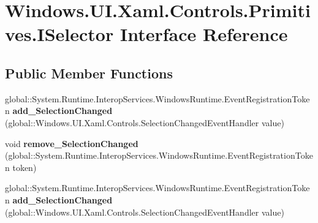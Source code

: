 \hypertarget{interface_windows_1_1_u_i_1_1_xaml_1_1_controls_1_1_primitives_1_1_i_selector}{}\section{Windows.\+U\+I.\+Xaml.\+Controls.\+Primitives.\+I\+Selector Interface Reference}
\label{interface_windows_1_1_u_i_1_1_xaml_1_1_controls_1_1_primitives_1_1_i_selector}
\subsection*{Public Member Functions}
\begin{DoxyCompactItemize}
\item 
\mbox{\label{interface_windows_1_1_u_i_1_1_xaml_1_1_controls_1_1_primitives_1_1_i_selector_ac3314f975ab7e2ffb6cd6d90c4000813}} 
global\+::\+System.\+Runtime.\+Interop\+Services.\+Windows\+Runtime.\+Event\+Registration\+Token {\bfseries add\+\_\+\+Selection\+Changed} (global\+::\+Windows.\+U\+I.\+Xaml.\+Controls.\+Selection\+Changed\+Event\+Handler value)
\item 
\mbox{\label{interface_windows_1_1_u_i_1_1_xaml_1_1_controls_1_1_primitives_1_1_i_selector_a5899b02dd76c1baceec6cafbaea9bd90}} 
void {\bfseries remove\+\_\+\+Selection\+Changed} (global\+::\+System.\+Runtime.\+Interop\+Services.\+Windows\+Runtime.\+Event\+Registration\+Token token)
\item 
\mbox{\label{interface_windows_1_1_u_i_1_1_xaml_1_1_controls_1_1_primitives_1_1_i_selector_ac3314f975ab7e2ffb6cd6d90c4000813}} 
global\+::\+System.\+Runtime.\+Interop\+Services.\+Windows\+Runtime.\+Event\+Registration\+Token {\bfseries add\+\_\+\+Selection\+Changed} (global\+::\+Windows.\+U\+I.\+Xaml.\+Controls.\+Selection\+Changed\+Event\+Handler value)
\item 
\mbox{\label{interface_windows_1_1_u_i_1_1_xaml_1_1_controls_1_1_primitives_1_1_i_selector_a5899b02dd76c1baceec6cafbaea9bd90}} 

\end{DoxyCompactItemize}
